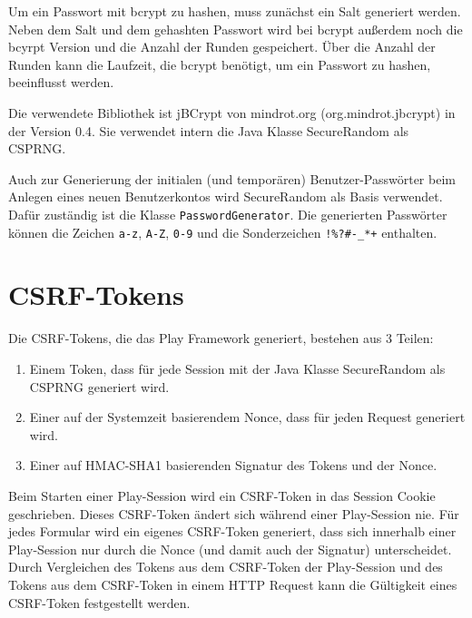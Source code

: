 \documentclass[12pt,DIV14,BCOR10mm,a4paper,parskip=half-,headsepline,headinclude,english,ngerman,bibliography=totocnumbered]{scrreprt}
\begin{document}
Um ein Passwort mit bcrypt zu hashen, muss zunächst ein Salt generiert werden. Neben dem Salt und dem gehashten Passwort wird bei bcrypt außerdem noch die bcyrpt Version und die Anzahl der Runden gespeichert. Über die Anzahl der Runden kann die Laufzeit, die bcrypt benötigt, um ein Passwort zu hashen, beeinflusst werden.

Die verwendete Bibliothek ist jBCrypt von mindrot.org (org.mindrot.jbcrypt) in der Version 0.4. Sie verwendet intern die Java Klasse SecureRandom als CSPRNG.

Auch zur Generierung der initialen (und temporären) Benutzer-Passwörter beim Anlegen eines neuen Benutzerkontos wird SecureRandom als Basis verwendet. Dafür zuständig ist die Klasse \texttt{PasswordGenerator}. Die generierten Passwörter können die Zeichen \texttt{a-z}, \texttt{A-Z}, \texttt{0-9} und die Sonderzeichen \texttt{!\%?\#-\_*+} enthalten.

\section{CSRF-Tokens}
Die CSRF-Tokens, die das Play Framework generiert, bestehen aus 3 Teilen:
\begin{enumerate}
\item Einem Token, dass für jede Session mit der Java Klasse SecureRandom als CSPRNG generiert wird.
\item Einer auf der Systemzeit basierendem Nonce, dass für jeden Request generiert wird.
\item Einer auf HMAC-SHA1 basierenden Signatur des Tokens und der Nonce.
\end{enumerate}

Beim Starten einer Play-Session wird ein CSRF-Token in das Session Cookie geschrieben. Dieses CSRF-Token ändert sich während einer Play-Session nie. Für jedes Formular wird ein eigenes CSRF-Token generiert, dass sich innerhalb einer Play-Session nur durch die Nonce (und damit auch der Signatur) unterscheidet. Durch Vergleichen des Tokens aus dem CSRF-Token der Play-Session und des Tokens aus dem CSRF-Token in einem HTTP Request kann die Gültigkeit eines CSRF-Token festgestellt werden.
\end{document}
